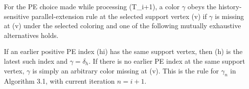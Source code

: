 \begin{definition}
For the PE choice made while processing (T_{i+1}), a color \(\gamma\)
obeys the history-sensitive parallel-extension rule at the selected support
vertex (v) if \(\gamma\) is missing at (v) under the selected coloring
and one of the following mutually exhaustive alternatives holds.

If an earlier positive PE index (h\leq i) has the same support vertex,
then (h) is the latest such index and
\(\gamma=\delta_h\).  If there is no earlier PE index at the same support
vertex, \(\gamma\) is simply an arbitrary color missing at (v).  This is
the rule for \(\gamma_n\) in Algorithm 3.1, with current iteration
\(n=i+1\).
\end{definition}

